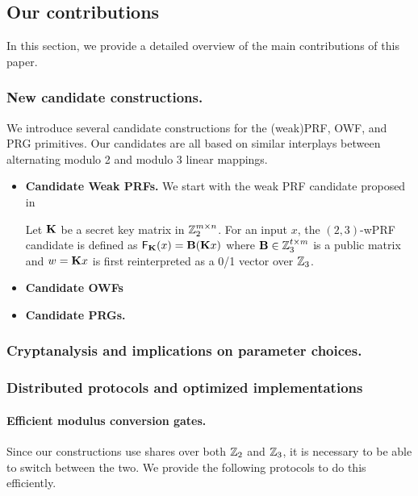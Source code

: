 \subsection{Our contributions}
In this section, we provide a detailed overview of the main contributions of this paper.

\subsubsection{New candidate constructions.}
We introduce several candidate constructions for the (weak)PRF, OWF, and PRG primitives. Our candidates are all based on similar interplays between alternating modulo 2 and modulo 3 linear mappings.

\begin{itemize}
    \item \textbf{Candidate Weak PRFs.}
    We start with the weak PRF candidate proposed in~\cite{boneh2018-darkmatter}

    Let $\mat{K}$ be a secret key matrix in $\mathbb{Z}_2^{m \times n}$. For an input $x$, the $(2,3)$-wPRF candidate is defined as $\mathsf{F}_\mat{K}(x) = \mat{B}(\mat{K}x)$ where $\mat{B} \in \Z_3^{t \times m}$ is a public matrix and $w = \mat{K}x$ is first reinterpreted as a 0/1 vector over $\mathbb{Z}_3$.


    \item \textbf{Candidate OWFs}

    \item \textbf{Candidate PRGs.}

\end{itemize}

\subsubsection{Cryptanalysis and implications on parameter choices.}


\subsubsection{Distributed protocols and optimized implementations}
 
\paragraph{Efficient modulus conversion gates.}
Since our constructions use shares over both $\mathbb{Z}_2$ and $\mathbb{Z}_3$, it is necessary to be able to switch between the two. We provide the following protocols to do this efficiently. 

